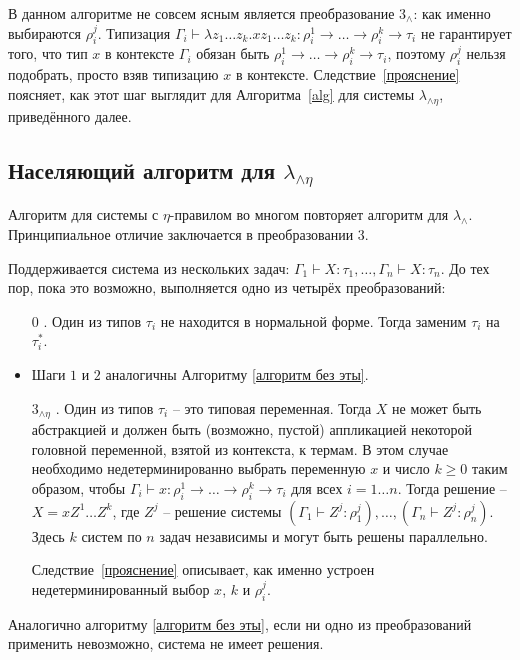 \documentclass[../main.tex]{subfiles}
\begin{document}
В данном алгоритме не совсем ясным является преобразование $3_{\wedge}$: как именно выбираются $\rho_i^j$. Типизация $\Gamma_i \vdash \lambda z_1 \dots z_k . x z_1 \dots z_k : \rho_i^1 \to \dots \to \rho_i^k \to \tau_i$ не гарантирует того, что тип $x$ в контексте $\Gamma_i$ обязан быть $ \rho_i^1 \to \dots \to \rho_i^k \to \tau_i$, поэтому $\rho_i^j$ нельзя подобрать, просто взяв типизацию $x$ в контексте. Следствие~\ref{прояснение} поясняет, как этот шаг выглядит для Алгоритма~\ref{alg} для системы $\lambda_{\wedge \eta}$, приведённого далее.

\subsection{Населяющий алгоритм для $\lambda_{\wedge \eta}$}

Алгоритм для системы с $\eta$-правилом во многом повторяет алгоритм для $\lambda_\wedge$. Принципиальное отличие заключается в преобразовании $3$.
\begin{algorithm} \label{alg} 
Поддерживается система из нескольких задач: $\Gamma_1 \vdash X : \tau_1 ,\dots, \Gamma_n \vdash X : \tau_n$. До тех пор, пока это возможно, выполняется одно из четырёх преобразований: 

\begin{itemize}

     \item [$0$]. Один из типов $\tau_i$ не находится в нормальной форме. Тогда заменим $\tau_i$ на $\tau_i^*$.
     \item Шаги $1$ и $2$ аналогичны Алгоритму \ref{алгоритм без эты}.
     
     \item [$3_{\wedge \eta}$]. Один из типов $\tau_i$ -- это типовая переменная. Тогда $X$ не может быть абстракцией и должен быть (возможно, пустой) аппликацией некоторой головной переменной, взятой из контекста, к термам. В этом случае необходимо недетерминированно выбрать переменную $x$ и число $k \geqslant 0$ таким образом, чтобы $\Gamma_i \vdash x : \rho_i^1 \to \dots \to \rho_i^k \to \tau_i$ для всех $i = 1 \dots n$. Тогда решение --  $X = x Z^1 \dots Z^k$, где $Z^j$ -- решение системы $(\Gamma_1 \vdash Z^j : \rho_1^j) ,\dots, (\Gamma_n \vdash Z^j : \rho_n^j)$. Здесь $k$ систем по $n$ задач независимы и могут быть решены параллельно.
     
     Следствие~\ref{прояснение} описывает, как именно устроен недетерминированный выбор $x$, $k$ и $\rho_i^j$.
     
\end{itemize}

Аналогично алгоритму \ref{алгоритм без эты}, если ни одно из преобразований применить невозможно, система не имеет решения. 

\end{algorithm}
\end{document}
